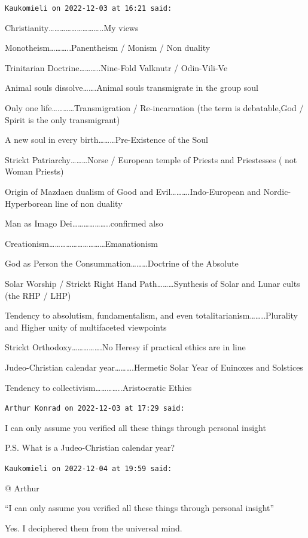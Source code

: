 \begin{footnotesize}
\begin{sffamily}
\hfill

\texttt{Kaukomieli on 2022-12-03 at 16:21 said:}

Christianity………………………..My views

Monotheism………..Panentheism / Monism / Non duality

Trinitarian Doctrine………..Nine-Fold Valknutr / Odin-Vili-Ve

Animal souls dissolve…….Animal souls transmigrate in the group soul

Only one life…………Transmigration / Re-incarnation (the term is debatable,God / Spirit is the only transmigrant)

A new soul in every birth………Pre-Existence of the Soul

Strickt Patriarchy………Norse / European temple of Priests and Priestesses ( not Woman Priests)

Origin of Mazdaen dualism of Good and Evil……….Indo-European and Nordic-Hyperborean line of non duality

Man as Imago Dei………………..confirmed also

Creationism…………………………Emanationism

God as Person the Consummation………Doctrine of the Absolute

Solar Worship / Strickt Right Hand Path………Synthesis of Solar and Lunar cults (the RHP / LHP)

Tendency to absolutism, fundamentalism, and even totalitarianism……..Plurality and Higher unity of multifaceted viewpoints

Strickt Orthodoxy…………….No Heresy if practical ethics are in line

Judeo-Christian calendar year……….Hermetic Solar Year of Euinoxes and Solstices

Tendency to collectivism…………..Aristocratic Ethics

\hfill

\texttt{Arthur Konrad on 2022-12-03 at 17:29 said:}

I can only assume you verified all these things through personal insight

P.S. What is a Judeo-Christian calendar year?

\hfill

\texttt{Kaukomieli on 2022-12-04 at 19:59 said:}

{@} Arthur

“I can only assume you verified all these things through personal insight”

Yes. I deciphered them from the universal mind.


\end{sffamily}
\end{footnotesize}
